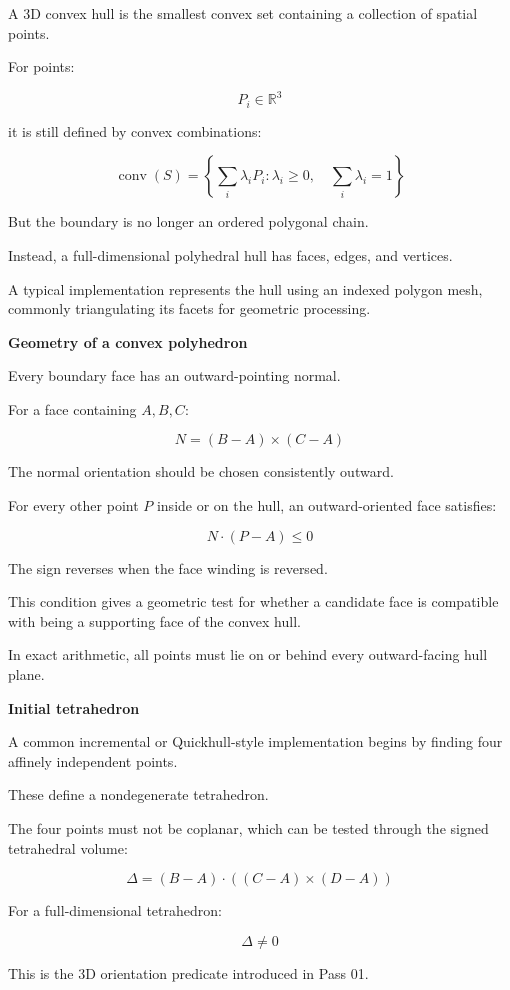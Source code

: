 A 3D convex hull is the smallest convex set containing a collection of spatial points.

For points:

\[
P_i\in\mathbb R^3
\]

it is still defined by convex combinations:

\[
\boxed{ \operatorname{conv}(S)= \left\{ \sum_i\lambda_iP_i: \lambda_i\ge0,\quad\sum_i\lambda_i=1 \right\} }
\]

But the boundary is no longer an ordered polygonal chain.

Instead, a full-dimensional polyhedral hull has faces, edges, and vertices.

A typical implementation represents the hull using an indexed polygon mesh, commonly triangulating its facets for geometric processing.

\textbf{Geometry of a convex polyhedron}

Every boundary face has an outward-pointing normal.

For a face containing \(A,B,C\):

\[
N=(B-A)\times(C-A)
\]

The normal orientation should be chosen consistently outward.

For every other point \(P\) inside or on the hull, an outward-oriented face satisfies:

\[
\boxed{ N\cdot(P-A)\le0 }
\]

The sign reverses when the face winding is reversed.

This condition gives a geometric test for whether a candidate face is compatible with being a supporting face of the convex hull.

In exact arithmetic, all points must lie on or behind every outward-facing hull plane.

\textbf{Initial tetrahedron}

A common incremental or Quickhull-style implementation begins by finding four affinely independent points.

These define a nondegenerate tetrahedron.

The four points must not be coplanar, which can be tested through the signed tetrahedral volume:

\[
\boxed{ \Delta= (B-A)\cdot((C-A)\times(D-A)) }
\]

For a full-dimensional tetrahedron:

\[
\Delta\ne0
\]

This is the 3D orientation predicate introduced in Pass 01.

